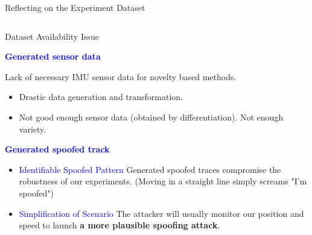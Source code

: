 \documentclass[aspectratio=169, 8pt]{beamer}
\begin{document}
\begin{frame}{Reflecting on the Experiment Dataset}

\begin{columns}[T]

    \begin{column}{0.5\linewidth}
        
    \begin{block}{Dataset Availability Issue}
            \item \textbf{\textcolor{blue}{Generated sensor data}}
            
            Lack of necessary IMU sensor data for novelty based methods.
            \begin{itemize}
                \item Drastic data generation and transformation.
                \item Not good enough sensor data (obtained by differentiation). Not enough variety.
            \end{itemize}
            \item \textbf{\textcolor{blue}{Generated spoofed track}} 
            
            \begin{itemize}
                \item \textcolor{blue}{Identifiable Spoofed Pattern} Generated spoofed traces compromise the robustness of our experiments. (Moving in a straight line simply screams "I'm spoofed")
                \item \textcolor{blue}{Simplification of Scenario} The attacker will usually monitor our position and speed to launch \textbf{a more plausible spoofing attack}.
            \end{itemize}
            
    \end{block}
    

    \end{column}
    

\end{columns}
\end{frame}
\end{document}
